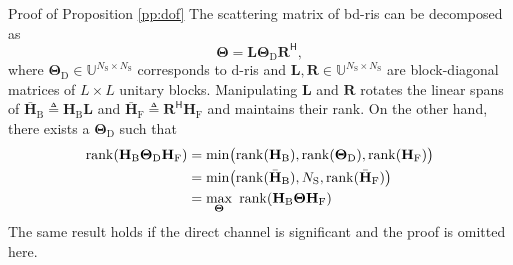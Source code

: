 \begin{appendix}
\begin{subsection}{Proof of Proposition \ref{pp:dof}}\label{ap:dof}
	The scattering matrix of \gls{bd}-\gls{ris} can be decomposed as
	\begin{equation}
		\mathbf{\Theta} = \mathbf{L} \mathbf{\Theta}_\mathrm{D} \mathbf{R}^\mathsf{H},
	\end{equation}
	where $\mathbf{\Theta}_\mathrm{D} \in \mathbb{U}^{N_\mathrm{S} \times N_\mathrm{S}}$ corresponds to \gls{d}-\gls{ris} and $\mathbf{L}, \mathbf{R} \in \mathbb{U}^{N_\mathrm{S} \times N_\mathrm{S}}$ are block-diagonal matrices of $L \times L$ unitary blocks.
	Manipulating $\mathbf{L}$ and $\mathbf{R}$ rotates the linear spans of $\bar{\mathbf{H}}_\mathrm{B} \triangleq \mathbf{H}_\mathrm{B} \mathbf{L}$ and $\bar{\mathbf{H}}_\mathrm{F} \triangleq \mathbf{R}^\mathsf{H} \mathbf{H}_\mathrm{F}$ and maintains their rank.
	On the other hand, there exists a $\mathbf{\Theta}_\mathrm{D}$ such that
	\begin{equation*}
		\begin{split}
			\operatorname{rank}(\mathbf{H}_\mathrm{B} \mathbf{\Theta}_\mathrm{D} \mathbf{H}_\mathrm{F})
			 & = \min \bigl( \operatorname{rank}(\mathbf{H}_\mathrm{B}), \operatorname{rank}(\mathbf{\Theta}_\mathrm{D}), \operatorname{rank}(\mathbf{H}_\mathrm{F}) \bigr) \\
			 & = \min \bigl( \operatorname{rank}(\bar{\mathbf{H}}_\mathrm{B}), N_\mathrm{S}, \operatorname{rank}(\bar{\mathbf{H}}_\mathrm{F}) \bigr)          \\
			 & = \max_\mathbf{\Theta} \ \operatorname{rank}(\mathbf{H}_\mathrm{B} \mathbf{\Theta} \mathbf{H}_\mathrm{F})
		\end{split}
	\end{equation*}
	The same result holds if the direct channel is significant and the proof is omitted here.
\end{subsection}


\end{appendix}
